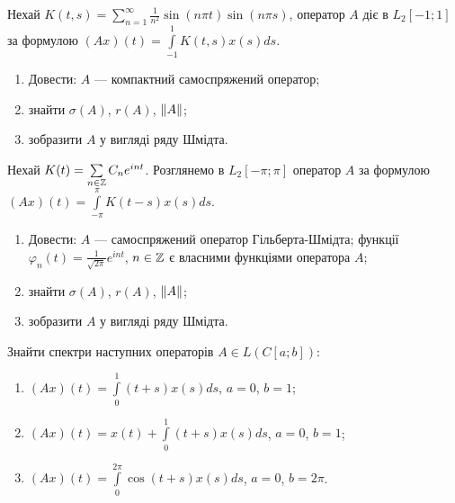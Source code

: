 
\begin{exercise}
    Нехай $K(t,s) = \sum\limits^\infty_{n=1} \frac{1}{n^2} \sin(n \pi t) \sin(n \pi s)$,
    оператор $A$ діє в $L_2[-1;1]$ за формулою $(Ax)(t) = \int\limits^1_{-1} K(t,s) x(s) ds$.
    \begin{enumerate}
        \item Довести: $A$ --- компактний самоспряжений оператор;
        \item знайти $\sigma(A)$, $r(A)$, $\left\lVert A\right\rVert$;
        \item зобразити $A$ у вигляді ряду Шмідта.
    \end{enumerate}
\end{exercise}

\begin{exercise}
    Нехай $K(t) = \sum\limits_{n \in \mathbb{Z}} C_n e^{i n t}$. Розглянемо в $L_2[-\pi; \pi]$
    оператор $A$ за формулою $(Ax)(t) = \int\limits^\pi_{-\pi} K(t-s) x(s) ds$.
    \begin{enumerate}
        \item Довести: $A$ --- самоспряжений оператор Гільберта-Шмідта; функції \\$\varphi_n(t) = 
        \frac{1}{\sqrt{2\pi}} e^{i n t}$, $n \in \mathbb{Z}$ є власними функціями оператора $A$;
        \item знайти $\sigma(A)$, $r(A)$, $\left\lVert A\right\rVert$;
        \item зобразити $A$ у вигляді ряду Шмідта.
    \end{enumerate}
\end{exercise}

\begin{exercise}
    Знайти спектри наступних операторів $A \in L(C[a;b])$:
    \begin{enumerate}
        \item $(Ax)(t) = \int\limits^1_0 (t+s)x(s)ds$, $a=0$, $b=1$;
        \item $(Ax)(t) = x(t) + \int\limits^1_0 (t+s)x(s)ds$, $a=0$, $b=1$;
        \item $(Ax)(t) = \int\limits^{2\pi}_0 \cos(t+s)x(s)ds$, $a=0$, $b=2\pi$.
    \end{enumerate}
\end{exercise}

